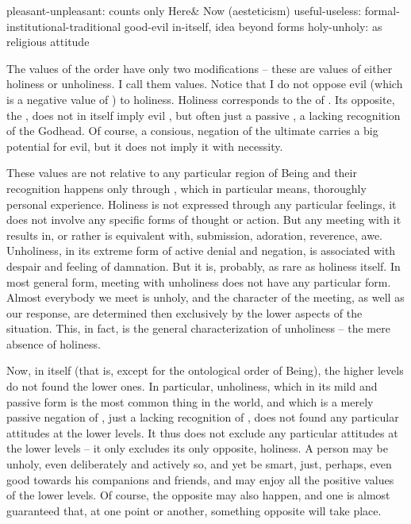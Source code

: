{
    {pleasant-unpleasant: counts only Here\& Now (aesteticism)}
    {useful-useless: formal-institutional-traditional}
    {good-evil in-itself, idea beyond forms}
    {holy-unholy: as religious attitude} 

    \pa\inv The values of the  order have only two
modifications -- these are values of either holiness or unholiness. I 
call them  values. 
Notice that I do not oppose evil (which is a negative value of
) to holiness.  Holiness corresponds to the  of \yes. Its opposite, the \No, does not in itself imply evil 
, but often just a passive \No, a lacking recognition of the 
Godhead. Of course, a consious,  negation of the ultimate 
 carries a big potential for evil, but it does not 
imply it with necessity.

These values are not relative to any particular region of Being and
their recognition happens only through , which in
particular means, thoroughly personal experience.  Holiness is not
expressed through any particular feelings, it does not involve any 
specific forms of thought or action. But any meeting with it results
in, or rather is equivalent with, submission, adoration, reverence, awe.
Unholiness, in its extreme
form of active denial and negation, is associated with despair and feeling of
damnation.  But it is, probably, as rare as holiness itself.  In most 
general form, meeting
with unholiness does not have any particular form. 
Almost everybody we meet is unholy, and the character of the meeting,
as well as our response, are determined then exclusively by the lower
aspects of the situation. This, in fact, is the general 
characterization of unholiness -- the mere absence of holiness.


\pa\label{pa:unholygood}
Now, in itself (that is, except for the ontological order of
Being), the higher levels do not found the lower ones.  In particular,
unholiness, which in its mild and passive form is the most common
thing in the world, and which is a merely passive negation of \No, just a
lacking recognition of \yes, does not found any particular attitudes
at the lower levels. It thus does not exclude any particular 
attitudes at the lower levels -- it only excludes its only opposite, 
holiness. A person may be unholy, even deliberately and actively so, 
and yet be smart, just, perhaps, even good towards his companions and 
friends, and may enjoy all the positive values of the lower levels. Of 
course, the opposite may also happen, and one is almost guaranteed 
that, at one point or another, something opposite will take place.

}
